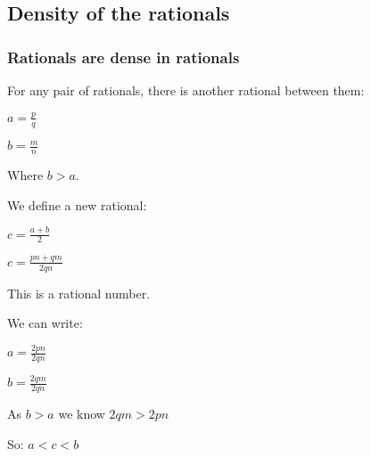 \subsection{Density of the rationals}

\subsubsection{Rationals are dense in rationals}

For any pair of rationals, there is another rational between them:

\(a=\frac{p}{q}\)

\(b=\frac{m}{n}\)

Where \(b>a\).

We define a new rational:

\(c=\frac{a+b}{2}\)

\(c=\frac{pn+qm}{2qn}\)

This is a rational number.

We can write:

\(a=\frac{2pn}{2qn}\)

\(b=\frac{2qm}{2qn}\)

As \(b>a\) we know \(2qm>2pn\)

So: \(a < c < b\)


